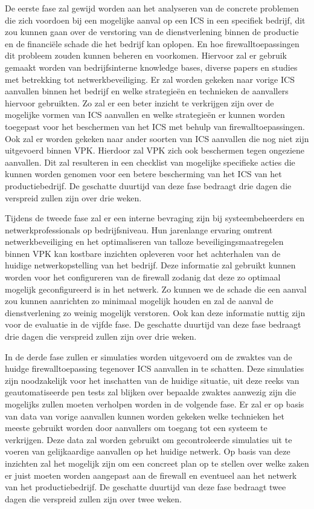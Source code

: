 De eerste fase zal gewijd worden aan het analyseren van de concrete problemen die zich voordoen bij een mogelijke aanval op een ICS in een specifiek bedrijf, dit zou kunnen gaan over de verstoring van de dienstverlening binnen de productie en de financiële schade die het bedrijf kan oplopen. En hoe firewalltoepassingen dit probleem zouden kunnen beheren en voorkomen. Hiervoor zal er gebruik gemaakt worden van bedrijfsinterne knowledge bases, diverse papers en studies met betrekking tot netwerkbeveiliging. Er zal worden gekeken naar vorige ICS aanvallen binnen het bedrijf en welke strategieën en technieken de aanvallers hiervoor gebruikten. Zo zal er een beter inzicht te verkrijgen zijn over de mogelijke vormen van ICS aanvallen en welke strategieën er kunnen worden toegepast voor het beschermen van het ICS met behulp van firewalltoepassingen. Ook zal er worden gekeken naar ander soorten van ICS aanvallen die nog niet zijn uitgevoerd binnen VPK. Hierdoor zal VPK zich ook beschermen tegen ongeziene aanvallen. Dit zal resulteren in een checklist van mogelijke specifieke acties die kunnen worden genomen voor een betere bescherming van het ICS van het productiebedrijf. De geschatte duurtijd van deze fase bedraagt drie dagen die verspreid zullen zijn over drie weken.

Tijdens de tweede fase zal er een interne bevraging zijn bij systeembeheerders en netwerkprofessionals op bedrijfsniveau. Hun jarenlange ervaring omtrent netwerkbeveiliging en het optimaliseren van talloze beveiligingsmaatregelen binnen VPK kan kostbare inzichten opleveren voor het achterhalen van de huidige netwerkopstelling van het bedrijf. Deze informatie zal gebruikt kunnen worden voor het configureren van de firewall zodanig dat deze zo optimaal mogelijk geconfigureerd is in het netwerk. Zo kunnen we de schade die een aanval zou kunnen aanrichten zo minimaal mogelijk houden en zal de aanval de dienstverlening zo weinig mogelijk verstoren. Ook kan deze informatie nuttig zijn voor de evaluatie in de vijfde fase. De geschatte duurtijd van deze fase bedraagt drie dagen die verspreid zullen zijn over drie weken.

In de derde fase zullen er simulaties worden uitgevoerd om de zwaktes van de huidge firewalltoepassing tegenover ICS aanvallen in te schatten. Deze simulaties zijn noodzakelijk voor het inschatten van de huidige situatie, uit deze reeks van geautomatiseerde pen tests zal blijken over bepaalde zwaktes aanwezig zijn die mogelijks zullen moeten verholpen worden in de volgende fase. Er zal er op basis van data van vorige aanvallen kunnen worden gekeken welke technieken het meeste gebruikt worden door aanvallers om toegang tot een systeem te verkrijgen. Deze data zal worden gebruikt om gecontroleerde simulaties  uit te voeren van gelijkaardige aanvallen op het huidige netwerk. Op basis van deze inzichten zal het mogelijk zijn om een concreet plan op te stellen over welke zaken er juist moeten worden aangepast aan de firewall en eventueel aan het netwerk van het productiebedrijf. De geschatte duurtijd van deze fase bedraagt twee dagen die verspreid zullen zijn over twee weken.

